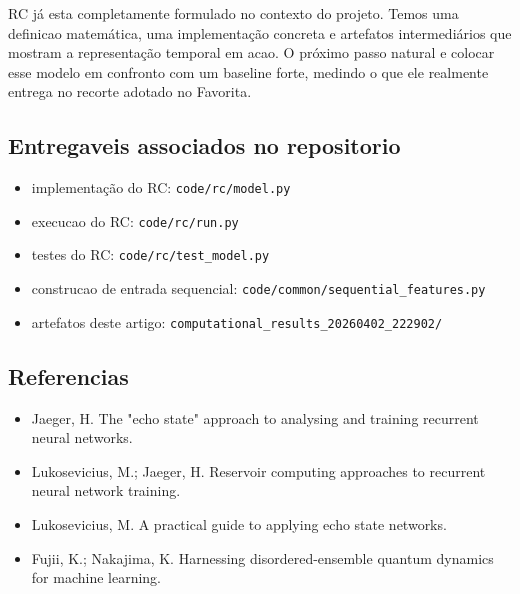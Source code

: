 \documentclass[12pt]{article}
\providecommand{\tightlist}{%
  \setlength{\itemsep}{0pt}\setlength{\parskip}{0pt}}
\begin{document}
RC já esta completamente formulado no contexto do projeto. Temos uma definicao matemática, uma implementação concreta e artefatos intermediários que mostram a representação temporal em acao. O próximo passo natural e colocar esse modelo em confronto com um baseline forte, medindo o que ele realmente entrega no recorte adotado no Favorita.

\subsection{Entregaveis associados no repositorio}\label{entregaveis-associados-no-repositorio}

\begin{itemize}
\tightlist
\item
  implementação do RC: \texttt{code/rc/model.py}
\item
  execucao do RC: \texttt{code/rc/run.py}
\item
  testes do RC: \texttt{code/rc/test\_model.py}
\item
  construcao de entrada sequencial: \texttt{code/common/sequential\_features.py}
\item
  artefatos deste artigo: \texttt{computational\_results\_20260402\_222902/}
\end{itemize}

\subsection{Referencias}\label{referencias}

\begin{itemize}
\tightlist
\item
  Jaeger, H. The "echo state" approach to analysing and training recurrent neural networks.
\item
  Lukosevicius, M.; Jaeger, H. Reservoir computing approaches to recurrent neural network training.
\item
  Lukosevicius, M. A practical guide to applying echo state networks.
\item
  Fujii, K.; Nakajima, K. Harnessing disordered-ensemble quantum dynamics for machine learning.
\end{itemize}
\end{document}
